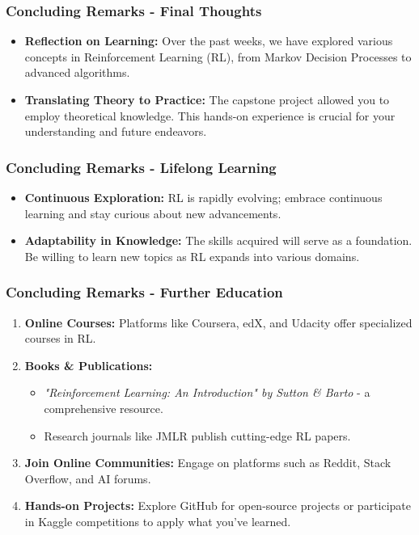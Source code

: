 \documentclass{beamer}
\begin{document}
\begin{frame}[fragile]
    \frametitle{Concluding Remarks - Final Thoughts}
    \begin{itemize}
        \item \textbf{Reflection on Learning:} 
        Over the past weeks, we have explored various concepts in Reinforcement Learning (RL), from Markov Decision Processes to advanced algorithms. 
        \item \textbf{Translating Theory to Practice:} 
        The capstone project allowed you to employ theoretical knowledge. This hands-on experience is crucial for your understanding and future endeavors.
    \end{itemize}
\end{frame}

\begin{frame}[fragile]
    \frametitle{Concluding Remarks - Lifelong Learning}
    \begin{itemize}
        \item \textbf{Continuous Exploration:} 
        RL is rapidly evolving; embrace continuous learning and stay curious about new advancements.
        \item \textbf{Adaptability in Knowledge:} 
        The skills acquired will serve as a foundation. Be willing to learn new topics as RL expands into various domains.
    \end{itemize}
\end{frame}

\begin{frame}[fragile]
    \frametitle{Concluding Remarks - Further Education}
    \begin{enumerate}
        \item \textbf{Online Courses:} Platforms like Coursera, edX, and Udacity offer specialized courses in RL.
        \item \textbf{Books \& Publications:} 
            \begin{itemize}
                \item \textit{"Reinforcement Learning: An Introduction" by Sutton \& Barto} - a comprehensive resource.
                \item Research journals like JMLR publish cutting-edge RL papers.
            \end{itemize}
        \item \textbf{Join Online Communities:} Engage on platforms such as Reddit, Stack Overflow, and AI forums.
        \item \textbf{Hands-on Projects:} Explore GitHub for open-source projects or participate in Kaggle competitions to apply what you've learned.
    \end{enumerate}
\end{frame}
\end{document}
